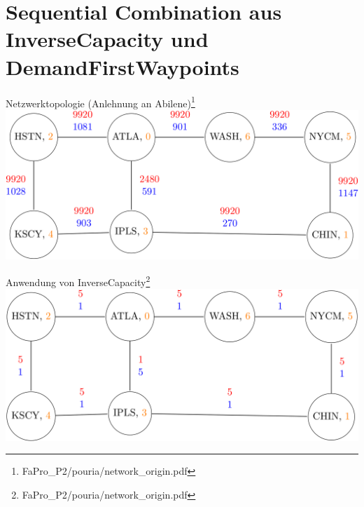 \documentclass[aspectratio=169,10pt]{beamer}
\begin{document}

\section{Sequential Combination aus InverseCapacity und DemandFirstWaypoints}
\begin{frame}{Netzwerktopologie (Anlehnung an Abilene)\footnote{FaPro\_P2/pouria/network\_origin.pdf}}
\includegraphics[width=\textwidth]{images/pouria1.png}
\end{frame}
\begin{frame}{Anwendung von InverseCapacity\footnote{FaPro\_P2/pouria/network\_origin.pdf}}
\includegraphics[width=\textwidth]{images/pouria2.png}
\end{frame}
\end{document}
